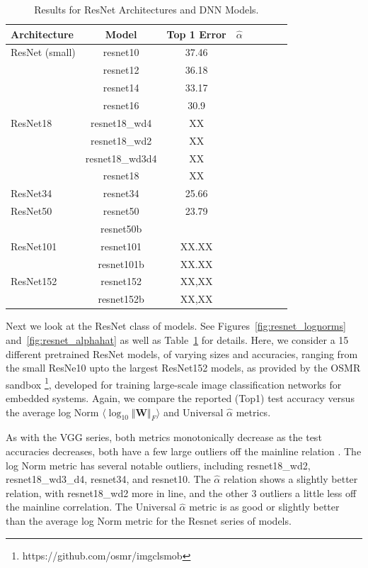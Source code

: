 \begin{table}[!htb]
\small
\begin{center}
\begin{tabular}{|p{0.75in}|c|c|c|c|c|c|c|}
\hline
Architecture 
 & Model
 & Top 1 Error & $\hat{\alpha}$ \\
\hline
ResNet (small)  & resnet10 & 37.46 & \\
& resnet12 & 36.18 & \\
& resnet14 & 33.17 & \\
& resnet16 & 30.9 & \\
\hline
ResNet18 & resnet18\_wd4 & XX & \\
& resnet18\_wd2 & XX & \\
& resnet18\_wd3d4& XX & \\
& resnet18 & XX & \\

\hline
ResNet34 & resnet34 & 25.66 & \\
\hline
ResNet50 & resnet50 & 23.79 & \\
& resnet50b &  & \\

\hline
ResNet101 & resnet101 & XX.XX & \\
& resnet101b & XX.XX & \\
\hline
ResNet152 & resnet152 & XX,XX & \\
& resnet152b & XX,XX & \\
\hline
\end{tabular}
\end{center}
\caption{Results for ResNet Architectures and DNN Models.
        }
\label{table:models_resnet}
\end{table}

Next we look at the ResNet class of models. 
See
Figures~\ref{fig:resnet_lognorms}
and~\ref{fig:resnet_alphahat}
as well as
Table~\ref{table:models_resnet}
for details.
Here, we consider a 15 different pretrained ResNet models, of varying sizes
and accuracies, ranging from the small ResNe10 upto the largest ResNet152 models,
as provided by the OSMR sandbox
\footnote{https://github.com/osmr/imgclsmob},
developed for  training large-scale image classification networks for embedded systems.
Again, we compare the reported (Top1) test accuracy versus the average log Norm 
$\langle\log_{10}\Vert\mathbf{W}\Vert_{F}\rangle$
and Universal $\hat{\alpha}$ metrics.

As with the VGG series, both metrics monotonically decrease as the test accuracies decreases,
both have a few large outliers off the mainline relation .  The log Norm metric has several notable outliers, 
including resnet18\_wd2, resnet18\_wd3\_d4, resnet34, and resnet10.
The $\hat{\alpha}$ relation shows a slightly better relation, with resnet18\_wd2 more in line, and
the other 3 outliers a little less off the mainline correlation.
The Universal $\hat{\alpha}$ metric is as good or slightly better than the average log Norm metric
for the Resnet series of models.  

